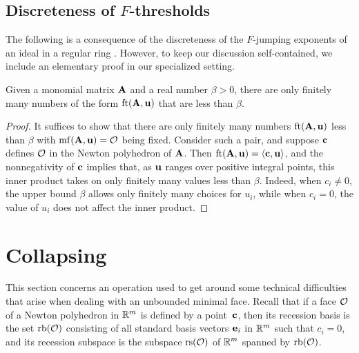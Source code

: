 \documentclass{amsart}
\begin{document}
\subsection{Discreteness of $F$-thresholds}

The following is a consequence of the discreteness of the $F$-jumping exponents of an ideal in a regular ring \cite[Theorem~3.1]{blickle+mustata+smith.discr_rat_FPTs}.
However, to keep our discussion self-contained, we include an elementary proof in our specialized setting.

\begin{proposition}
   \label{discreteness: P}
   Given a monomial matrix $\mathbf{A}$ and a real number $\beta > 0 $, there are only finitely many numbers of the form $\operatorname{ft}(\mathbf{A}, \mathbf{u})$ that are less than $\beta$.
\end{proposition}

\begin{proof}
   It suffices to show that there are only finitely many numbers $\operatorname{ft}(\mathbf{A}, \mathbf{u})$ less than $\beta$ with $\operatorname{mf}(\mathbf{A}, \mathbf{u}) = \mathcal{O}$ being fixed.
   Consider such a pair, and suppose $\mathbf{c}$ defines $\mathcal{O}$ in the Newton polyhedron of $\mathbf{A}$.
   Then $\operatorname{ft}(\mathbf{A}, \mathbf{u}) = \langle \mathbf{c}, \mathbf{u} \rangle$, and the nonnegativity of $\mathbf{c}$ implies that, as $\mathbf{u}$ ranges over positive integral points, this inner product takes on only finitely many values less than $\beta$.
   Indeed, when $c_i \ne 0$, the upper bound $\beta$ allows only finitely many choices for $u_i$, while when $c_i = 0$, the value of $u_i$ does not affect the inner product.
\end{proof}

\section{Collapsing}

This section concerns an operation used to get around some technical difficulties that arise when dealing with an unbounded minimal face.
Recall that if a face $\mathcal{O}$ of a Newton polyhedron in $\mathbb{R}^m$ is defined by a point~$\mathbf{c}$, then its recession basis is the set $\operatorname{rb}(\mathcal{O})$ consisting of all standard basis vectors $\mathbf{e}_i$ in $\mathbb{R}^m$ such that $c_i = 0$, and its recession subspace is the subspace $\operatorname{rs}(\mathcal{O})$ of $\mathbb{R}^m$ spanned by $\operatorname{rb}(\mathcal{O})$.
\end{document}
